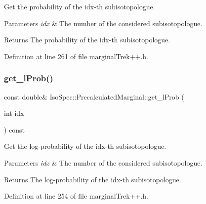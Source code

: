 Get the probability of the idx-\/th subisotopologue. 


\begin{DoxyParams}{Parameters}
{\em idx} & The number of the considered subisotopologue. \\
\hline
\end{DoxyParams}
\begin{DoxyReturn}{Returns}
The probability of the idx-\/th subisotopologue. 
\end{DoxyReturn}


Definition at line 261 of file marginal\+Trek++.\+h.

\mbox{\label{class_iso_spec_1_1_precalculated_marginal_a07eee6d60635c9c1d6f92c181994e06a}} 
\subsubsection{\texorpdfstring{get\+\_\+l\+Prob()}{get\_lProb()}}
{\footnotesize\ttfamily const double\& Iso\+Spec\+::\+Precalculated\+Marginal\+::get\+\_\+l\+Prob (\begin{DoxyParamCaption}\item[{int}]{idx }\end{DoxyParamCaption}) const\hspace{0.3cm}{\ttfamily [inline]}}



Get the log-\/probability of the idx-\/th subisotopologue. 


\begin{DoxyParams}{Parameters}
{\em idx} & The number of the considered subisotopologue. \\
\hline
\end{DoxyParams}
\begin{DoxyReturn}{Returns}
The log-\/probability of the idx-\/th subisotopologue. 
\end{DoxyReturn}


Definition at line 254 of file marginal\+Trek++.\+h.

\mbox{\label{class_iso_spec_1_1_precalculated_marginal_af5d01500c7efb8cba57399ba11fc7124}} 
